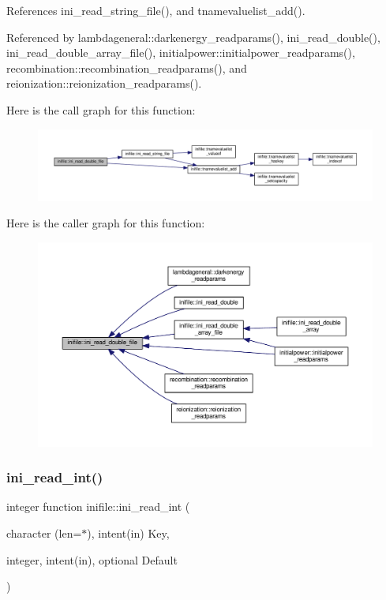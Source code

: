 References ini\+\_\+read\+\_\+string\+\_\+file(), and tnamevaluelist\+\_\+add().



Referenced by lambdageneral\+::darkenergy\+\_\+readparams(), ini\+\_\+read\+\_\+double(), ini\+\_\+read\+\_\+double\+\_\+array\+\_\+file(), initialpower\+::initialpower\+\_\+readparams(), recombination\+::recombination\+\_\+readparams(), and reionization\+::reionization\+\_\+readparams().

Here is the call graph for this function\+:
\nopagebreak
\begin{figure}[H]
\begin{center}
\leavevmode
\includegraphics[width=350pt]{namespaceinifile_aa190adb34f30ac9ceb261db1bff4e736_cgraph}
\end{center}
\end{figure}
Here is the caller graph for this function\+:
\nopagebreak
\begin{figure}[H]
\begin{center}
\leavevmode
\includegraphics[width=350pt]{namespaceinifile_aa190adb34f30ac9ceb261db1bff4e736_icgraph}
\end{center}
\end{figure}
\mbox{\label{namespaceinifile_a9e879031e39e829173144313b77f5ca7}} 
\subsubsection{\texorpdfstring{ini\+\_\+read\+\_\+int()}{ini\_read\_int()}}
{\footnotesize\ttfamily integer function inifile\+::ini\+\_\+read\+\_\+int (\begin{DoxyParamCaption}\item[{character (len=$\ast$), intent(in)}]{Key,  }\item[{integer, intent(in), optional}]{Default }\end{DoxyParamCaption})}



